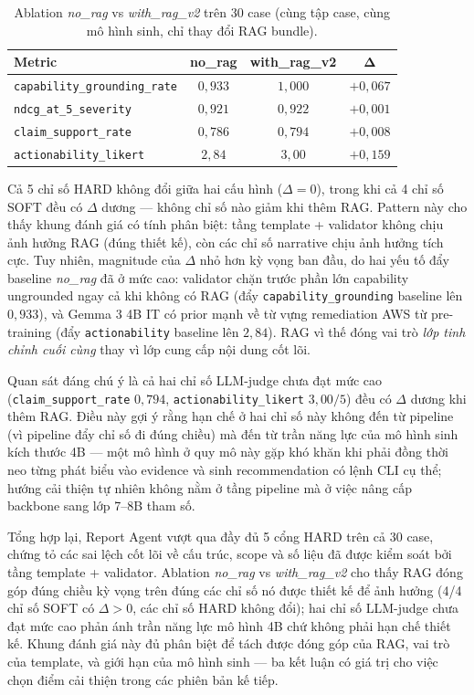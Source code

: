 \begin{table}[!htb]
\centering
\caption{Ablation \emph{no\_rag} vs \emph{with\_rag\_v2} trên 30 case (cùng tập case, cùng mô hình sinh, chỉ thay đổi RAG bundle).}
\label{tab:report_rag_ablation}
\small
\begin{tabular}{lccc}
\toprule
\textbf{Metric} & \textbf{no\_rag} & \textbf{with\_rag\_v2} & $\boldsymbol{\Delta}$ \\
\midrule
\texttt{capability\_grounding\_rate} & $0{,}933$ & $1{,}000$ & $+0{,}067$ \\
\texttt{ndcg\_at\_5\_severity}       & $0{,}921$ & $0{,}922$ & $+0{,}001$ \\
\texttt{claim\_support\_rate}        & $0{,}786$ & $0{,}794$ & $+0{,}008$ \\
\texttt{actionability\_likert}       & $2{,}84$  & $3{,}00$  & $+0{,}159$ \\
\bottomrule
\end{tabular}
\end{table}

Cả 5 chỉ số HARD không đổi giữa hai cấu hình ($\Delta = 0$), trong khi cả 4 chỉ số SOFT đều có $\Delta$ dương --- không chỉ số nào giảm khi thêm RAG. Pattern này cho thấy khung đánh giá có tính phân biệt: tầng template + validator không chịu ảnh hưởng RAG (đúng thiết kế), còn các chỉ số narrative chịu ảnh hưởng tích cực. Tuy nhiên, magnitude của $\Delta$ nhỏ hơn kỳ vọng ban đầu, do hai yếu tố đẩy baseline \emph{no\_rag} đã ở mức cao: validator chặn trước phần lớn capability ungrounded ngay cả khi không có RAG (đẩy \texttt{capability\_grounding} baseline lên $0{,}933$), và Gemma 3 4B IT có prior mạnh về từ vựng remediation AWS từ pre-training (đẩy \texttt{actionability} baseline lên $2{,}84$). RAG vì thế đóng vai trò \emph{lớp tinh chỉnh cuối cùng} thay vì lớp cung cấp nội dung cốt lõi.

Quan sát đáng chú ý là cả hai chỉ số LLM-judge chưa đạt mức cao (\texttt{claim\_support\_rate} $0{,}794$, \texttt{actionability\_likert} $3{,}00/5$) đều có $\Delta$ dương khi thêm RAG. Điều này gợi ý rằng hạn chế ở hai chỉ số này không đến từ pipeline (vì pipeline đẩy chỉ số đi đúng chiều) mà đến từ trần năng lực của mô hình sinh kích thước 4B --- một mô hình ở quy mô này gặp khó khăn khi phải đồng thời neo từng phát biểu vào evidence và sinh recommendation có lệnh CLI cụ thể; hướng cải thiện tự nhiên không nằm ở tầng pipeline mà ở việc nâng cấp backbone sang lớp 7--8B tham số.

Tổng hợp lại, Report Agent vượt qua đầy đủ 5 cổng HARD trên cả 30 case, chứng tỏ các sai lệch cốt lõi về cấu trúc, scope và số liệu đã được kiểm soát bởi tầng template + validator. Ablation \emph{no\_rag} vs \emph{with\_rag\_v2} cho thấy RAG đóng góp đúng chiều kỳ vọng trên đúng các chỉ số nó được thiết kế để ảnh hưởng (4/4 chỉ số SOFT có $\Delta > 0$, các chỉ số HARD không đổi); hai chỉ số LLM-judge chưa đạt mức cao phản ánh trần năng lực mô hình 4B chứ không phải hạn chế thiết kế. Khung đánh giá này đủ phân biệt để tách được đóng góp của RAG, vai trò của template, và giới hạn của mô hình sinh --- ba kết luận có giá trị cho việc chọn điểm cải thiện trong các phiên bản kế tiếp.


